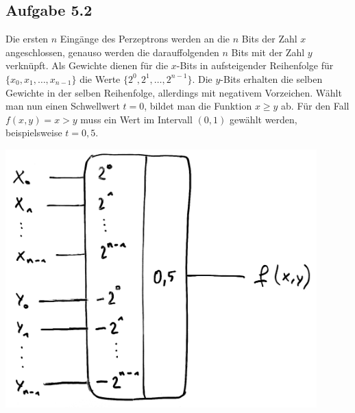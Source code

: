 \documentclass{article}
\begin{document}
    \subsection*{Aufgabe 5.2}
    \begin{minipage}[h]{0.6\textwidth}
        Die ersten $n$ Eingänge des Perzeptrons werden an die $n$ Bits der Zahl $x$ angeschlossen, genauso werden die darauffolgenden $n$ Bits mit der Zahl $y$ verknüpft. Als Gewichte dienen für die $x$-Bits in aufsteigender Reihenfolge für $\{x_0, x_1, \ldots, x_{n-1}\}$ die Werte $\{2^0, 2^1, \ldots , 2^{n-1}\}$. Die $y$-Bits erhalten die selben Gewichte in der selben Reihenfolge, allerdings mit negativem Vorzeichen. Wählt man nun einen Schwellwert $t=0$, bildet man die Funktion $x \ge y$ ab. Für den Fall $f(x, y)= x>y$ muss ein Wert im Intervall $(0,1)$ gewählt werden, beispielsweise $t=0,5$.
    \end{minipage}
    \begin{minipage}[h]{0.35\textwidth}
        \hspace{0.5cm}
        \includegraphics[width=0.9\textwidth]{perzeptron.jpeg}
    \end{minipage}
\end{document}
